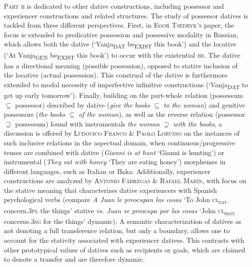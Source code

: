 \documentclass[output=paper,modfonts,nonflat,colorlinks,citecolor=brown]{langsci/langscibook}
\begin{document}
{\textsc{Part ii} is dedicated to} other{ dative constructions, including possessor and experiencer constructions and related structures. The study of possessor datives is tackled from three different perspectives. First, in \textsc{Egor Tsedryk’s} paper,} the focus is extended to predicative possession and possessive modality in Russian, which allows both the dative (‘Vanja\textsc{\textsubscript{DAT}} be\textsc{\textsubscript{EXIST}} this book’) and the locative (‘At Vanja\textsubscript{GEN} be\textsubscript{EXIST} this book’) to occur with the existential \textsc{be}. The dative has a directional meaning (possible possession), opposed to stative inclusion of the locative (actual possession). This construal of the dative is furthermore extended to modal necessity of imperfective infinitive constructions (‘Vanja\textsubscript{DAT} to get up early tomorrow’).  Finally, building on the part-whole relation (possessum {${\subseteq}$} possessor) described by dative ({\textit{give the books} ${\subseteq}$ \textit{to the woman}}) and genitive possessors ({\textit{the books} ${\subseteq}$ \textit{of the woman}}), as well as the reverse relation (possessor {${\supseteq}$} possessum) found with instrumentals {\textit{the woman} ${\supseteq}$ \textit{with the books}}, a discussion is offered by \textsc{Ludovico Franco \& Paolo Lorusso} on the instances of such inclusive relations in the aspectual domain, when continuous/progressive tenses are combined with dative ({\textit{Gianni is at hunt}} ‘Gianni is hunting’) or instrumental ({\textit{They eat with honey}} ‘They are eating honey’) morphemes in different languages, such as Italian or Baka. Additionally, experiencer{ constructions are analyzed by \textsc{Antonio Fábregas \& Rafael Marín}, with focus on the stative meaning that characterizes dative experiencers with Spanish psychological verbs (compare \textit{A Juan le preocupan las cosas} ‘To John \textsc{cl\textsubscript{dat}} concern.\textsc{3pl} the things’ stative \textit{vs. Juan se preocupa por las cosas} ‘John \textsc{cl\textsubscript{refl}} concerns.\textsc{3sg} for the things’ dynamic). A semantic characterization of datives as not denoting a full transference relation, but only a boundary, allows one to account for the stativity associated with experiencer datives. This contrasts with other prototypical values of datives such as recipients or goals, which are claimed to denote a transfer and are therefore dynamic}.
\end{document}
